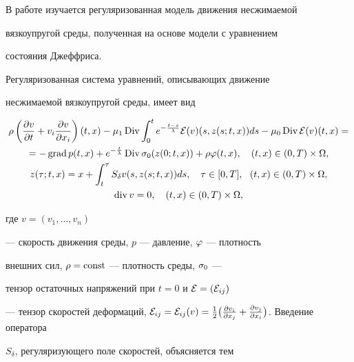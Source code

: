 \setcounter{section}{0}





В работе изучается регуляризованная модель движения несжимаемой


вязкоупругой среды, полученная на основе модели с уравнением


состояния Джеффриса.





Регуляризованная система уравнений, описывающих движение


несжимаемой вязкоупругой среды, имеет вид


\begin{gather}


\rho\left(\fr{v}{t}+v_i \fr{v}{x_i}\right)(t,x)-\mu_1 \Div


\intl{0}{t}e^{-\frac{t-s}{\lb}}\E(v)(s,z(s;t,x))


ds-\mu_0\Div\E(v)(t,x)=\notag \\


%


\label{e01}


=-\grad p(t,x)+e^{-\frac{t}{\lb}}\Div \sig_0(z(0;t,x))


+\rho \ph(t,x),\quad (t,x) \in (0,T)\times\Om,\\


%


\label{e02} z(\tau;t,x)=x+


\intl{t}{\tau}S_{\delta}v(s,z(s;t,x)) ds,\quad\tau\in [0,T],


\ \ (t,x) \in (0,T)\times\Om,\\


%


\label{e03} \dv v=0,\quad (t,x)\in(0,T)\times\Om,


\end{gather}


где $v=(v_1,\dotsc,v_n)$


--- скорость движения среды, $p$ --- давление, $\varphi$ --- плотность


внешних сил, $\rho=\operatorname{const}$ --- плотность среды, $\sigma_0$ ---


тензор остаточных напряжений при $t=0$ и ${\cal E}=({\cal E}_{ij})$


--- тензор скоростей деформаций, $\E_{ij}=\E_{ij}(v)=\frac 1


2 \big(\fr{v_i}{x_j}+\fr{v_j}{x_i}\big)$. Введение оператора


$S_{\delta}$, регуляризующего поле скоростей, объясняется тем


